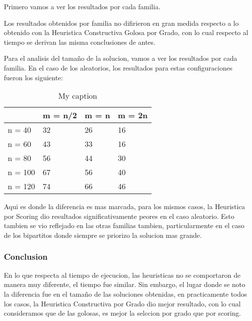 \newpage
Primero vamos a ver los resultados por cada familia.

Los resultados obtenidos por familia no difirieron en gran medida respecto a lo obtenido con la Heuristica Constructiva Golosa por Grado, con lo cual respecto al tiempo se derivan las misma conclusiones de antes.

Para el analisis del tamaño de la solucion, vamos a ver los resultados por cada familia. En el caso de los aleatorios, los resultados para estas configuraciones fueron los siguiente:

\begin{table}[]
\centering
\caption{My caption}
\label{my-label}
\begin{tabular}{|l|lll|}
\hline
        & \multicolumn{1}{l|}{m = n/2} & \multicolumn{1}{l|}{m = n} & m = 2n \\ \hline
n = 40  & 32                           & 26                         & 16     \\ \cline{1-1}
n = 60  & 43                           & 33                         & 16     \\ \cline{1-1}
n = 80  & 56                           & 44                         & 30     \\ \cline{1-1}
n = 100 & 67                           & 56                         & 40     \\ \cline{1-1}
n = 120 & 74                           & 66                         & 46     \\ \hline
\end{tabular}
\end{table}

Aqui es donde la diferencia es mas marcada, para los mismos casos, la Heuristica por Scoring dio resultados significativamente peores en el caso aleatorio. Esto tambien se vio reflejado en las otras familias tambien, particularmente en el caso de los bipartitos donde siempre se priorizo la solucion mas grande.

\subsubsection{Conclusion}

En lo que respecta al tiempo de ejecucion, las heuristicas no se comportaron de manera muy diferente, el tiempo fue similar. Sin embargo, el lugar donde se noto la diferencia fue en el tamaño de las soluciones obtenidas, en practicamente todos los casos, la Heuristica Constructiva por Grado dio mejor resultado, con lo cual consideramos que de las golosas, es mejor la selccion por grado que por scoring.